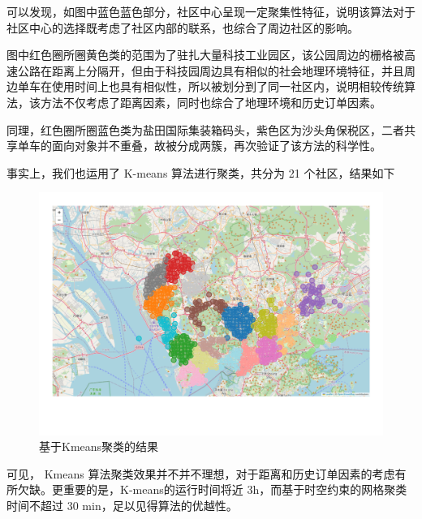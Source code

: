 \documentclass[12pt,a4paper,oneside]{ctexart}
\begin{document}
可以发现，如图中蓝色蓝色部分，社区中心呈现一定聚集性特征，说明该算法对于社区中心的选择既考虑了社区内部的联系，也综合了周边社区的影响。

图中红色圈所圈黄色类的范围为了驻扎大量科技工业园区，该公园周边的栅格被高速公路在距离上分隔开，但由于科技园周边具有相似的社会地理环境特征，并且周边单车在使用时间上也具有相似性，所以被划分到了同一社区内，说明相较传统算法，该方法不仅考虑了距离因素，同时也综合了地理环境和历史订单因素。

同理，红色圈所圈蓝色类为盐田国际集装箱码头，紫色区为沙头角保税区，二者共享单车的面向对象并不重叠，故被分成两簇，再次验证了该方法的科学性。

事实上，我们也运用了 K-means 算法进行聚类，共分为 21 个社区，结果如下
\begin{figure}[H]
    \centering
    \includegraphics[width=\textwidth]{Figs/kmeans.pdf}
    \caption{基于Kmeans聚类的结果}
    \label{fig:kmeans}
\end{figure}

可见， Kmeans 算法聚类效果并不并不理想，对于距离和历史订单因素的考虑有所欠缺。更重要的是，K-means的运行时间将近 3h，而基于时空约束的网格聚类时间不超过 30 min，足以见得算法的优越性。
\end{document}
